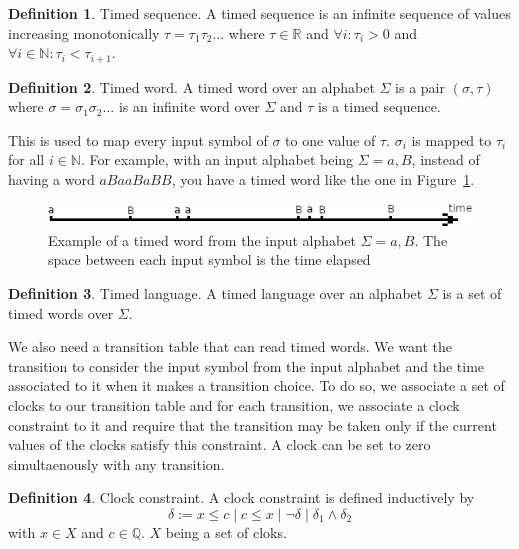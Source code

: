 \documentclass[12pt]{article}
\theoremstyle{definition}
\newtheorem{definition}{Definition}[section]
\theoremstyle{definition}
\theoremstyle{remark}
\newcommand{\R}{\mathbb{R}}
\newcommand{\Q}{\mathbb{Q}}
\begin{document}
\theoremstyle{definition}
\begin{definition}{Timed sequence.}
A timed sequence is an infinite sequence of values increasing monotonically $\tau = \tau_1 \tau_2 ...$ where $\tau \in \R$ and $\forall i : \tau_i > 0$ and $\forall i \in \mathbb{N}: \tau_i < \tau_{i+1}$.
\end{definition}

\theoremstyle{definition}
\begin{definition}{Timed word.}
A timed word over an alphabet $\Sigma$ is a pair $(\sigma, \tau)$ where $\sigma = \sigma_1 \sigma_2 ...$ is an infinite word over $\Sigma$ and $\tau$ is a timed sequence.
\end{definition}

This is used to map every input symbol of $\sigma$ to one value of $\tau$. $\sigma_i$ is mapped to $\tau_i$ for all $i \in \mathbb{N}$. For example, with an input alphabet being $\Sigma = {a, B}$, instead of having a word $aBaaBaBB$, you have a timed word like the one in Figure~\ref{timed_word}.

\begin{figure}
    \centering
    \includegraphics[scale=3]{timed_word.png}
    \caption{Example of a timed word from the input alphabet $\Sigma = {a, B}$. The space between each input symbol is the time elapsed}
    \label{timed_word}
\end{figure}

\theoremstyle{definition}
\begin{definition}{Timed language.}
A timed language over an alphabet $\Sigma$ is a set of timed words over $\Sigma$.
\end{definition}

We also need a transition table that can read timed words. We want the transition to consider the input symbol from the input alphabet and the time associated to it when it makes a transition choice. To do so, we associate a set of clocks to our transition table and for each transition, we associate a clock constraint to it and require that the transition may be taken only if the current values of the clocks satisfy this constraint. A clock can be set to zero simultaenously with any transition.

\theoremstyle{definition}
\begin{definition}{Clock constraint.} A clock constraint is defined inductively by
$$\delta := x \le c \mid c \le x \mid \neg \delta \mid \delta_1 \land \delta_2$$ with $x \in X$ and $c \in \Q$. $X$ being a set of cloks.
\end{definition}
\end{document}
